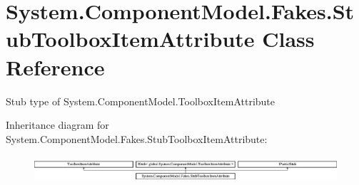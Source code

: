 \hypertarget{class_system_1_1_component_model_1_1_fakes_1_1_stub_toolbox_item_attribute}{\section{System.\-Component\-Model.\-Fakes.\-Stub\-Toolbox\-Item\-Attribute Class Reference}
\label{class_system_1_1_component_model_1_1_fakes_1_1_stub_toolbox_item_attribute}
}


Stub type of System.\-Component\-Model.\-Toolbox\-Item\-Attribute 


Inheritance diagram for System.\-Component\-Model.\-Fakes.\-Stub\-Toolbox\-Item\-Attribute\-:\begin{figure}[H]
\begin{center}
\leavevmode
\includegraphics[height=1.011743cm]{class_system_1_1_component_model_1_1_fakes_1_1_stub_toolbox_item_attribute}
\end{center}
\end{figure}
